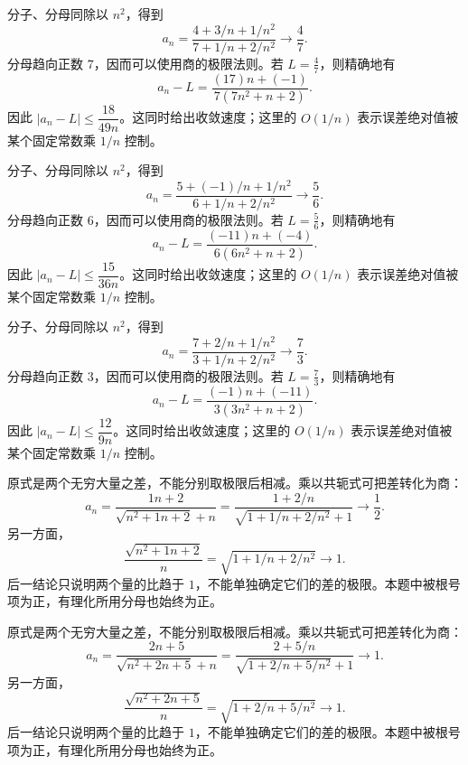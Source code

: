\documentclass[12pt,fontset=fandol]{ctexart}
\begin{document}
\begin{solve}\label{ans:c1q4}
分子、分母同除以 $n^2$，得到
\[
a_n=\frac{4+3/n+1/n^2}{7+1/n+2/n^2}\longrightarrow \frac{4}{7}.
\]
分母趋向正数 $7$，因而可以使用商的极限法则。若 $L=\frac{4}{7}$，则精确地有
\[
a_n-L=\frac{(17)n+(-1)}{7(7n^2+n+2)}.
\]
因此 $|a_n-L|\le\dfrac{18}{49n}$。这同时给出收敛速度；这里的 $O(1/n)$ 表示误差绝对值被某个固定常数乘 $1/n$ 控制。
\end{solve}

\begin{solve}\label{ans:c1q5}
分子、分母同除以 $n^2$，得到
\[
a_n=\frac{5+(-1)/n+1/n^2}{6+1/n+2/n^2}\longrightarrow \frac{5}{6}.
\]
分母趋向正数 $6$，因而可以使用商的极限法则。若 $L=\frac{5}{6}$，则精确地有
\[
a_n-L=\frac{(-11)n+(-4)}{6(6n^2+n+2)}.
\]
因此 $|a_n-L|\le\dfrac{15}{36n}$。这同时给出收敛速度；这里的 $O(1/n)$ 表示误差绝对值被某个固定常数乘 $1/n$ 控制。
\end{solve}

\begin{solve}\label{ans:c1q6}
分子、分母同除以 $n^2$，得到
\[
a_n=\frac{7+2/n+1/n^2}{3+1/n+2/n^2}\longrightarrow \frac{7}{3}.
\]
分母趋向正数 $3$，因而可以使用商的极限法则。若 $L=\frac{7}{3}$，则精确地有
\[
a_n-L=\frac{(-1)n+(-11)}{3(3n^2+n+2)}.
\]
因此 $|a_n-L|\le\dfrac{12}{9n}$。这同时给出收敛速度；这里的 $O(1/n)$ 表示误差绝对值被某个固定常数乘 $1/n$ 控制。
\end{solve}

\begin{solve}\label{ans:c1q7}
原式是两个无穷大量之差，不能分别取极限后相减。乘以共轭式可把差转化为商：
\[
a_n=\frac{1n+2}{\sqrt{n^2+1n+2}+n}=\frac{1+2/n}{\sqrt{1+1/n+2/n^2}+1}\longrightarrow \frac{1}{2}.
\]
另一方面，
\[
\frac{\sqrt{n^2+1n+2}}n=\sqrt{1+1/n+2/n^2}\longrightarrow1.
\]
后一结论只说明两个量的比趋于 $1$，不能单独确定它们的差的极限。本题中被根号项为正，有理化所用分母也始终为正。
\end{solve}

\begin{solve}\label{ans:c1q8}
原式是两个无穷大量之差，不能分别取极限后相减。乘以共轭式可把差转化为商：
\[
a_n=\frac{2n+5}{\sqrt{n^2+2n+5}+n}=\frac{2+5/n}{\sqrt{1+2/n+5/n^2}+1}\longrightarrow 1.
\]
另一方面，
\[
\frac{\sqrt{n^2+2n+5}}n=\sqrt{1+2/n+5/n^2}\longrightarrow1.
\]
后一结论只说明两个量的比趋于 $1$，不能单独确定它们的差的极限。本题中被根号项为正，有理化所用分母也始终为正。
\end{solve}
\end{document}
